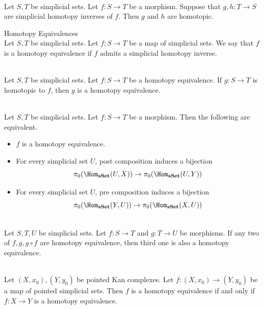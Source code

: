 \documentclass[a4paper]{article}
\begin{document}
\begin{lmm}{}{}\\
Let $S,T$ be simplicial sets. Let $f:S\to T$ be a morphism. Suppose that $g,h:T\to S$ are simplicial homotopy inverses of $f$. Then $g$ and $h$ are homotopic. 
\end{lmm}

\begin{defn}{Homotopy Equivalences}{}\\
Let $S,T$ be simplicial sets. Let $f:S\to T$ be a map of simplicial sets. We say that $f$ is a homotopy equivalence if $f$ admits a simplicial homotopy inverse. 
\end{defn}

\begin{lmm}{}{}\\
Let $S,T$ be simplicial sets. Let $f:S\to T$ be a homotopy equivalence. If $g:S\to T$ is homotopic to $f$, then $g$ is a homotopy equivalence. 
\end{lmm}

\begin{prp}{}{}\\
Let $S,T$ be simplicial sets. Let $f:S\to T$ be a morphism. Then the following are equivalent. 
\begin{itemize}
\item $f$ is a homotopy equivalence. 
\item For every simplicial set $U$, post composition induces a bijection $$\pi_0(\Hom_{\bold{sSet}}(U,X))\to\pi_0(\Hom_{\bold{sSet}}(U,Y))$$
\item For every simplicial set $U$, pre composition induces a bijection $$\pi_0(\Hom_{\bold{sSet}}(Y,U))\to\pi_0(\Hom_{\bold{sSet}}(X,U))$$
\end{itemize}
\end{prp}

\begin{prp}{}{}\\
Let $S,T,U$ be simplicial sets. Let $f:S\to T$ and $g:T\to U$ be morphisms. If any two of $f,g,g\circ f$ are homotopy equivalence, then third one is also a homotopy equivalence. 
\end{prp}

\begin{prp}{}{}\\
Let $(X,x_0),(Y,y_0)$ be pointed Kan complexes. Let $f:(X,x_0)\to(Y,y_0)$ be a map of pointed simplicial sets. Then $f$ is a homotopy equivalence if and only if $f:X\to Y$ is a homotopy equivalence. 
\end{prp}
\end{document}
